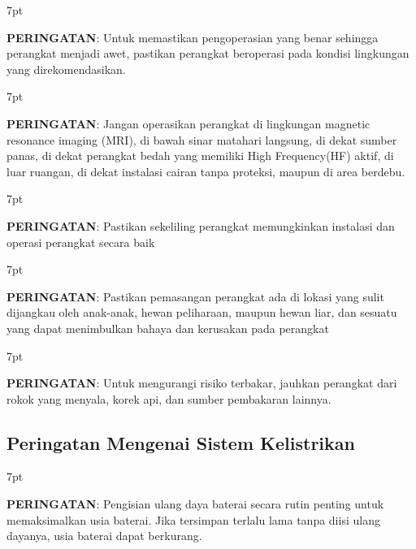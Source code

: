 \documentclass[11pt,a4paper,twoside,onecolumn]{book}
\newenvironment{formalred}{%
	\def\FrameCommand{%
		\hspace{1pt}%
		{\color{red}\vrule width 2pt}%
		{\color{formalshade}\vrule width 4pt}%
		\colorbox{formalshade}%
	}%
	\MakeFramed{\advance\hsize-\width\FrameRestore}%
	\noindent\hspace{-4.55pt}%
	\begin{adjustwidth}{}{7pt}%
		\vspace{2pt}\vspace{2pt}%
	}
	{%
		\vspace{2pt}\end{adjustwidth}\endMakeFramed%
}
\begin{document}
				\begin{formalred}
					\raisebox{0.125ex}{\resizebox{!}{2ex}{\danger}} \textbf{PERINGATAN}: 
					Untuk memastikan pengoperasian yang benar sehingga perangkat menjadi awet, pastikan perangkat beroperasi pada kondisi lingkungan yang direkomendasikan.
				\end{formalred}
			
				\begin{formalred}
					\raisebox{0.125ex}{\resizebox{!}{2ex}{\danger}} \textbf{PERINGATAN}: 
					Jangan operasikan perangkat di lingkungan magnetic resonance imaging (MRI), di bawah sinar matahari langsung, di dekat sumber panas, di dekat perangkat bedah yang memiliki High Frequency(HF) aktif, di luar ruangan, di dekat instalasi cairan tanpa proteksi, maupun di area berdebu.
				\end{formalred}
			
				\begin{formalred}
					\raisebox{0.125ex}{\resizebox{!}{2ex}{\danger}} \textbf{PERINGATAN}: 
					Pastikan sekeliling perangkat memungkinkan instalasi dan operasi perangkat secara baik
				\end{formalred}
			
				\begin{formalred}
					\raisebox{0.125ex}{\resizebox{!}{2ex}{\danger}} \textbf{PERINGATAN}: 
					Pastikan pemasangan perangkat ada di lokasi yang sulit dijangkau oleh anak-anak, hewan peliharaan, maupun hewan liar, dan sesuatu yang dapat menimbulkan bahaya dan kerusakan pada perangkat
				\end{formalred}
			
				\begin{formalred}
					\raisebox{0.125ex}{\resizebox{!}{2ex}{\danger}} \textbf{PERINGATAN}: 
					Untuk mengurangi risiko terbakar, jauhkan perangkat dari rokok yang menyala, korek api, dan sumber pembakaran lainnya.
				\end{formalred}			
				
			\subsection{Peringatan Mengenai Sistem Kelistrikan}
				\begin{formalred}
					\raisebox{0.125ex}{\resizebox{!}{2ex}{\danger}} \textbf{PERINGATAN}: 
					Pengisian ulang daya baterai secara rutin penting untuk memaksimalkan usia baterai. Jika tersimpan terlalu lama tanpa diisi ulang dayanya, usia baterai dapat berkurang.
				\end{formalred}
				
\end{document}

